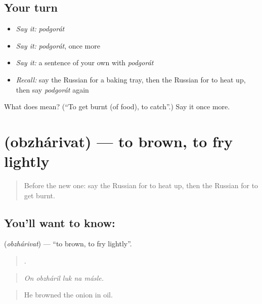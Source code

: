 \subsection*{Your turn}
\begin{itemize}
\raggedright
  \item \emph{Say it:} \emph{podgorát}
  \item \emph{Say it:} \emph{podgorát}, once more
  \item \emph{Say it:} a sentence of your own with \emph{podgorát}
  \item \emph{Recall:} say the Russian for a baking tray, then the Russian for to heat up, then say \emph{podgorát} again
\end{itemize}

\begin{tcolorbox}[breakable,colback=teal!4,colframe=teal!35!black,title={Before you move on}]
What does  mean? (\textquotedblleft{}To get burnt (of food), to catch\textquotedblright{}.) Say it once more.
\end{tcolorbox}
\section[\texorpdfstring{\ru{обжаривать} (obzhárivat)}{обжаривать (obzhárivat)}]{ (obzhárivat) — to brown, to fry lightly}

\label{lesson:RU-C332-obzharivat}



\begin{quote}
Before the new one: say the Russian for to heat up, then the Russian for to get burnt.
\end{quote}

\subsection*{You'll want to know: }
\textbf{} (\emph{obzhárivat}) — \textquotedblleft{}to brown, to fry lightly\textquotedblright{}.

\begin{quote}
    .
\end{quote}

\begin{quote}
\emph{On obzháril luk na másle.}
\end{quote}

\begin{quote}
He browned the onion in oil.
\end{quote}

